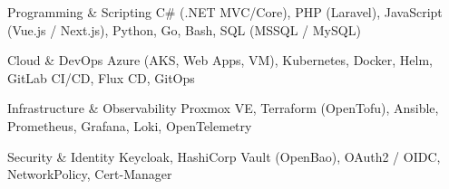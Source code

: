 
\begin{cvskills}

  \cvskill
    {Programming \& Scripting} %
    {C\# (.NET MVC/Core), PHP (Laravel), JavaScript (Vue.js / Next.js), Python, Go, Bash, SQL (MSSQL / MySQL)} %

  \cvskill
    {Cloud \& DevOps} %
    {Azure (AKS, Web Apps, VM), Kubernetes, Docker, Helm, GitLab CI/CD, Flux CD, GitOps} %

  \cvskill
    {Infrastructure \& Observability} %
    {Proxmox VE, Terraform (OpenTofu), Ansible, Prometheus, Grafana, Loki, OpenTelemetry} %

  \cvskill
    {Security \& Identity} %
    {Keycloak, HashiCorp Vault (OpenBao), OAuth2 / OIDC, NetworkPolicy, Cert-Manager} %

\end{cvskills}

